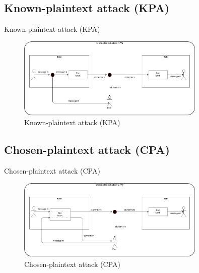 \documentclass[ucs,9pt]{beamer}
\begin{document}
\subsection{Known-plaintext attack (KPA)}

\begin{frame}{Known-plaintext attack (KPA)}
    
    \begin{figure}[h]
        \centering
        \includegraphics[width=0.8\textwidth]{figures/KPA.png}
        \caption{Known-plaintext attack (KPA)}
    \end{figure}
\end{frame}


\subsection{Chosen-plaintext attack (CPA)}

\begin{frame}{Chosen-plaintext attack (CPA)}
    
    \begin{figure}[h]
        \centering
        \includegraphics[width=0.8\textwidth]{figures/CPA.png}
        \caption{Chosen-plaintext attack (CPA)}
    \end{figure}
\end{frame}



\end{document}
